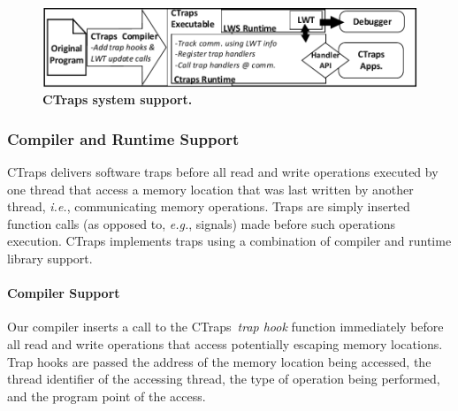 \documentclass[preprint,9pt]{sigplanconf}
\newcommand{\ctraps}{CTraps\xspace}
\begin{document}
\begin{figure}[htb]
\centering
\includegraphics[width=.90\columnwidth]{figs/CTraps_Overview.pdf}
\caption{\label{fig:systemdiagram}{\bf CTraps system support.}}
\end{figure}



\subsubsection{Compiler and Runtime Support} 

\ctraps delivers software traps before all read and write operations executed
by one thread that access a memory location that was last written by another
thread, {\em i.e.}, communicating memory operations.  Traps are simply inserted
function calls (as opposed to, {\em e.g.}, signals) made before such operations
execution.  \ctraps implements traps using a combination of compiler and
runtime library support.   

\paragraph{Compiler Support}
Our compiler inserts a call to the \ctraps~{\em trap hook} function immediately
before all read and write operations that access potentially escaping memory
locations.  Trap hooks are passed the address of the memory location being
accessed, the thread identifier of the accessing thread, the type of operation
being performed, and the program point of the access.  
\end{document}

